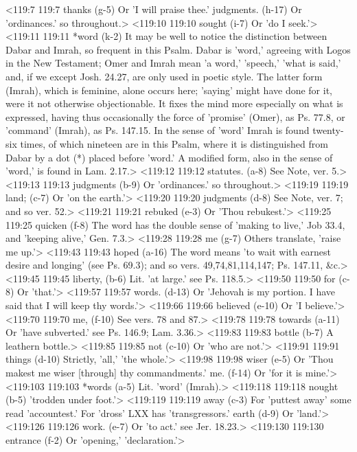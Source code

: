 <119:7 119:7  thanks (g-5)  Or 'I will praise thee.'
  judgments. (h-17)  Or 'ordinances.' so throughout.>
<119:10 119:10  sought (i-7)  Or 'do I seek.'>
<119:11 119:11  *word (k-2)  It may be well to notice the distinction between Dabar and  Imrah, so frequent in this Psalm. Dabar is 'word,' agreeing  with Logos in the New Testament; Omer and Imrah mean 'a  word,' 'speech,' 'what is said,' and, if we except Josh. 24.27,  are only used in poetic style. The latter form (Imrah), which  is feminine, alone occurs here; 'saying' might have done for  it, were it not otherwise objectionable. It fixes the mind more  especially on what is expressed, having thus occasionally the  force of 'promise' (Omer), as Ps. 77.8, or 'command'  (Imrah), as Ps. 147.15. In the sense of 'word' Imrah is  found twenty-six times, of which nineteen are in this Psalm,  where it is distinguished from Dabar by a dot (*) placed  before 'word.' A modified form, also in the sense of 'word,' is  found in Lam. 2.17.>
<119:12 119:12  statutes. (a-8)  See Note, ver. 5.>
<119:13 119:13  judgments (b-9)  Or 'ordinances.' so throughout.>
<119:19 119:19  land; (c-7)  Or 'on the earth.'>
<119:20 119:20  judgments (d-8)  See Note, ver. 7; and so ver. 52.>
<119:21 119:21  rebuked (e-3)  Or 'Thou rebukest.'>
<119:25 119:25  quicken (f-8)  The word has the double sense of 'making to live,' Job 33.4,  and 'keeping alive,' Gen. 7.3.>
<119:28 119:28  me (g-7)  Others translate, 'raise me up.'>
<119:43 119:43  hoped (a-16)  The word means 'to wait with earnest desire and longing' (see  Ps. 69.3); and so vers. 49,74,81,114,147; Ps. 147.11, &c.>
<119:45 119:45  liberty, (b-6)  Lit. 'at large.' see Ps. 118.5.>
<119:50 119:50  for (c-8)  Or 'that.'>
<119:57 119:57  words. (d-13)  Or 'Jehovah is my portion. I have said that I will keep thy  words.'>
<119:66 119:66  believed (e-10)  Or 'I believe.'>
<119:70 119:70  me, (f-10)  See vers. 78 and 87.>
<119:78 119:78  towards (a-11)  Or 'have subverted.' see Ps. 146.9; Lam. 3.36.>
<119:83 119:83  bottle (b-7)  A leathern bottle.>
<119:85 119:85  not (c-10)  Or 'who are not.'>
<119:91 119:91  things (d-10)  Strictly, 'all,' 'the whole.'>
<119:98 119:98  wiser (e-5)  Or 'Thou makest me wiser [through] thy commandments.'
  me. (f-14)  Or 'for it is mine.'>
<119:103 119:103  *words (a-5)  Lit. 'word' (Imrah).>
<119:118 119:118  nought (b-5)  'trodden under foot.'>
<119:119 119:119  away (c-3)  For 'puttest away' some read 'accountest.' For 'dross' LXX  has 'transgressors.'
  earth (d-9)  Or 'land.'>
<119:126 119:126  work. (e-7)  Or 'to act.' see Jer. 18.23.>
<119:130 119:130  entrance (f-2)  Or 'opening,' 'declaration.'>
